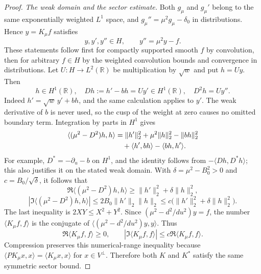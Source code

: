 \documentclass[11pt,a4paper]{article}
\newcommand{\R}{\mathbb R}
\begin{document}
\begin{proof}
\emph{The weak domain and the sector estimate.}
Both $g_\mu$ and $g_\mu'$ belong to the same exponentially weighted $L^1$ space, and
$g_\mu''=\mu^2g_\mu-\delta_0$ in distributions. Hence $y=K_\mu f$ satisfies
\[
 y,y',y''\in H,\qquad y''=\mu^2y-f.
\]
These statements follow first for compactly supported smooth $f$ by convolution, then for arbitrary $f\in H$ by the weighted convolution bounds and convergence in distributions. Let $U:H\longrightarrow L^2(\R)$ be multiplication by $\sqrt w$ and put $h=Uy$. Then
\[
 h\in H^1(\R),\quad D h:=h'-bh=Uy'\in H^1(\R),
 \quad D^2h=Uy''.
\]
Indeed $h'=\sqrt w\,y'+bh$, and the same calculation applies to $y'$. The weak derivative of $b$ is never used, so the cusp of the weight at zero causes no omitted boundary term. Integration by parts in $H^1$ gives
\begin{align*}
 \langle(\mu^2-D^2)h,h\rangle
 &=\|h'\|_2^2+\mu^2\|h\|_2^2-\|bh\|_2^2\notag\\
 &\quad+\langle h',bh\rangle-\langle bh,h'\rangle.
\end{align*}
For example, $D^*=-\partial_u-b$ on $H^1$, and the identity follows from
$-\langle Dh,D^*h\rangle$; this also justifies it on the stated weak domain. With
$\delta=\mu^2-B_0^2>0$ and $c=B_0/\sqrt\delta$, it follows that
\[
 \Re\langle(\mu^2-D^2)h,h\rangle
 \ge\|h'\|_2^2+\delta\|h\|_2^2,
\]
\[
 |\Im\langle(\mu^2-D^2)h,h\rangle|
 \le2B_0\|h'\|_2\|h\|_2
 \le c\bigl(\|h'\|_2^2+\delta\|h\|_2^2\bigr).
\]
The last inequality is $2XY\le X^2+Y^2$. Since
$(\mu^2-d^2/du^2)y=f$, the number $\langle K_\mu f,f\rangle$ is the conjugate of
$\langle(\mu^2-d^2/du^2)y,y\rangle$. Thus
\begin{equation}\label{eq:masGreensector}
 \Re\langle K_\mu f,f\rangle\ge0,
 \qquad |\Im\langle K_\mu f,f\rangle|
 \le c\Re\langle K_\mu f,f\rangle.
\end{equation}
Compression preserves this numerical-range inequality because
$\langle PK_\mu x,x\rangle=\langle K_\mu x,x\rangle$ for $x\in V^\perp$.
Therefore both $K$ and $K^*$ satisfy the same symmetric sector bound.


\end{proof}
\end{document}
